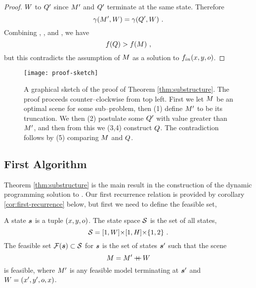 \begin{proof}
  $\Wall$ to $\CfTruncScene$ since $\TruncScene$ and $\CfTruncScene$
  terminate at the same state. Therefore
  \begin{equation}
    \label{eq:equal-penalties}
    \CornerPenalty(\TruncScene,\Wall) =
    \CornerPenalty(\CfTruncScene,\Wall) ~.
  \end{equation}
  Combining , , and
  , we have
  \begin{equation}
    \Objective(\CfScene) > \Objective(\Scene) ~,
  \end{equation}
  but this contradicts the assumption of $\Scene$ as a solution to
  $\SubProbIN(x,y,\WallOrient)$.
\end{proof}

\begin{figure}[tb]
  \centering
  \texttt{[image: proof-sketch]}
  \caption{A graphical sketch of the proof of Theorem
    \ref{thm:substructure}. The proof proceeds counter--clockwise from top
    left. First we let $\Scene$ be an optimal scene for some
    sub--problem, then (1) define $\TruncScene$ to be its
    truncation. We then (2) postulate some $\CfTruncScene$ with value
    greater than $\TruncScene$, and then from this we (3,4) construct
    $\CfScene$. The contradiction follows by (5) comparing $\Scene$
    and $\CfScene$.}
  \label{fig:proof-sketch}
\end{figure}

\subsection{First Algorithm}
Theorem \ref{thm:substructure} is the main result in the construction
of the dynamic programming solution to . Our first
recurrence relation is provided by corollary
\ref{cor:first-recurrence} below, but first we need to define the
feasible set,
\begin{definition}
  A state $\State$ is a tuple $(x,y,\WallOrient)$. The state space
  $\StateSpace$ is the set of all states,
  \begin{equation}
    \StateSpace = [1,\Width] \cross [1,\Height] \cross \{1,2\} ~.
  \end{equation}
  The feasible set $\FeasibleSet(\State) \subset \StateSpace$ for
  $\State$ is the set of states $\State'$ such that the scene
  \begin{equation}
    \Scene = \Scene' \concat \Wall
  \end{equation}
  is feasible, where $\Scene'$ is any feasible model terminating at
  $\State'$ and $\Wall=(x',y',\WallOrient,x)$.
\end{definition}

